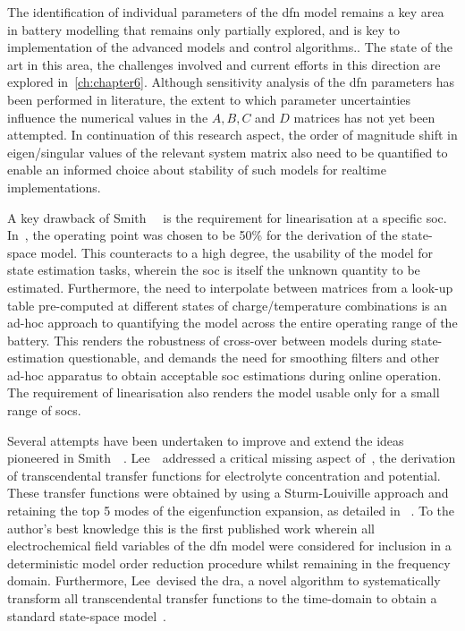 The identification of individual parameters of the \gls{dfn} model remains a key area in battery modelling that remains
only partially explored, and is key to implementation of the advanced models and control algorithms.. The state of the art in this area, the challenges involved and current efforts in
this direction are explored in~\cref{ch:chapter6}. Although sensitivity analysis of the \gls{dfn} parameters has been
performed in literature,  the extent to which parameter uncertainties influence the numerical values
in the $A, B, C$ and $D$ matrices has not yet been attempted. In continuation of this research aspect, the order of
magnitude shift in eigen/singular values of the relevant system matrix also need to be quantified to enable an informed
choice about stability of such models for realtime implementations.

A key drawback of Smith~\etal{}~\cite{Smith2007} is the requirement for linearisation at a specific \gls{soc}.
In~\cite{Smith2007}, the operating point was chosen to be 50\% for the derivation of the state-space model. This
counteracts to a high degree, the usability of the model for state estimation tasks, wherein the \gls{soc} is itself the
unknown quantity to be estimated. Furthermore, the need to interpolate between matrices from a look-up table
pre-computed at different states of charge/temperature combinations is an ad-hoc approach to quantifying the model
across the entire operating range of the battery. This renders the robustness of cross-over between models during
state-estimation questionable, and demands the need for smoothing filters and other ad-hoc apparatus to obtain
acceptable \gls{soc} estimations during online operation. The requirement of linearisation also renders the model usable
only for a small range of \gls{soc}s.

Several attempts have been undertaken to improve and extend the ideas pioneered in Smith~\etal{}~\cite{Smith2007}.
Lee~\etal{}~addressed a critical missing aspect of~\cite{Smith2007}, \viz the derivation of transcendental transfer
functions for electrolyte concentration and potential. These transfer functions were obtained by using a Sturm-Louiville
approach and retaining the top 5 modes of the eigenfunction expansion, as detailed in~\cite{Lee2012} . To the author's
best knowledge this is the first published work wherein all electrochemical field variables of the \gls{dfn} model were
considered for inclusion in a deterministic model order reduction procedure whilst remaining in the frequency
domain. Furthermore, Lee~\etal devised the \gls{dra}, a novel algorithm to systematically transform all transcendental
transfer functions to the time-domain to obtain a standard state-space model~\cite{Lee2012a}.

